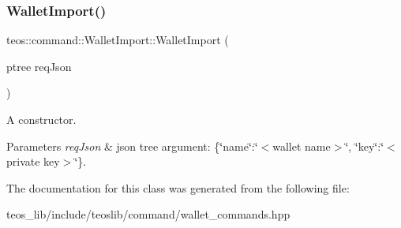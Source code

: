 \subsubsection{\texorpdfstring{Wallet\+Import()}{WalletImport()}\hspace{0.1cm}{\footnotesize\ttfamily [2/2]}}
{\footnotesize\ttfamily teos\+::command\+::\+Wallet\+Import\+::\+Wallet\+Import (\begin{DoxyParamCaption}\item[{ptree}]{req\+Json }\end{DoxyParamCaption})\hspace{0.3cm}{\ttfamily [inline]}}



A constructor. 


\begin{DoxyParams}{Parameters}
{\em req\+Json} & json tree argument\+: \{\char`\"{}name\char`\"{}\+:\char`\"{}$<$wallet name$>$\char`\"{}, \char`\"{}key\char`\"{}\+:\char`\"{}$<$private key$>$\char`\"{}\}. \\
\hline
\end{DoxyParams}


The documentation for this class was generated from the following file\+:\begin{DoxyCompactItemize}
\item 
teos\+\_\+lib/include/teoslib/command/wallet\+\_\+commands.\+hpp\end{DoxyCompactItemize}
